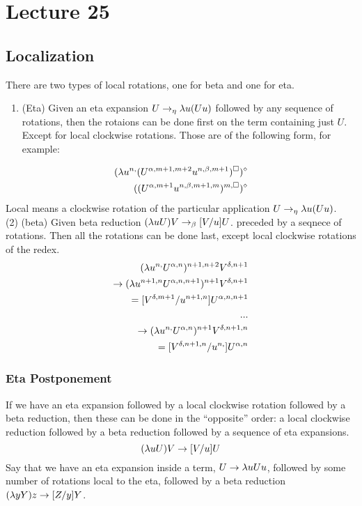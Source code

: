 \chapter{Lecture 25}

\section{Localization}
There are two types of local rotations, one for beta and one for eta.

\begin{enumerate}[(1)]
  \item (Eta) Given an eta expansion $U \rightarrow_\eta \lambda u(Uu)$ followed by any sequence of rotations, then the rotaions can be done first on the term containing just $U$. Except for local clockwise rotations. Those are of the following form, for example:
\end{enumerate}
\begin{eqnarray*}
  (\lambda u^{n,} (U^{\alpha,m+1,m+2}u^{n,\beta,m+1})^\square)^\diamond\\
  ((U^{\alpha,m+1}u^{n,\beta,m+1,m})^{m,\square})^\diamond
\end{eqnarray*}
Local means a clockwise rotation of the particular application $U \rightarrow_\eta \lambda u(Uu)$.\\

(2) (beta) Given beta reduction $(\lambda uU)V \rightarrow_\beta [V/u]U$. preceded by a seqnece of rotations. Then all the rotations can be done last, except local clockwise rotations of the redex.
\begin{eqnarray*}
  (\l u^{n,}U^{\alpha,n})^{n+1,n+2}V^{\delta,n+1}\\
  \rightarrow (\l u^{n+1,n}U^{\alpha,n,n+1})^{n+1}V^{\delta,n+1}\\ %
  = [V^{\delta,m+1}/u^{n+1,n}]U^{\alpha,n,n+1}\\ %
  ...\\
  \rightarrow (\l u^{n,}U^{\alpha,n})^{n+1}V^{\delta,n+1,n}\\ %
  = [V^{\delta,n+1,n}/u^{n,}]U^{\alpha,n}
\end{eqnarray*}

\subsection{Eta Postponement}
If we have an eta expansion followed by a local clockwise rotation followed by a beta reduction, then these can be done in the ``opposite'' order: a local clockwise reduction followed by a beta reduction followed by a sequence of eta expansions.
\begin{equation*}
  (\lambda uU)V \rightarrow [V/u]U
\end{equation*}
Say that we have an eta expansion inside a term, $U \rightarrow \lambda uUu$, followed by some number of rotations local to the eta, followed by a beta reduction $(\lambda yY)z \rightarrow [Z/y]Y$.

